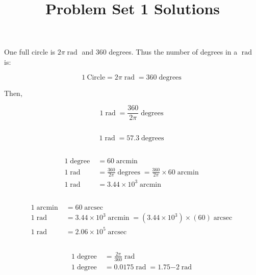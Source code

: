 \documentclass[11pt]{scrartcl}
\title{Problem Set 1 Solutions}
\DeclareMathOperator{\arcsec}{arcsec}
\DeclareMathOperator{\rad}{rad}
\DeclareMathOperator{\degrees}{degrees}
\DeclareMathOperator{\degree}{degree}
\DeclareMathOperator{\arcmin}{arcmin}
\newcommand\pow[2]{\ensuremath{#1 \times 10^{#2}}}
\begin{document}
\maketitle

\section{}

One full circle is $2\pi \rad$ and $360$ degrees. Thus the number of degrees in a $\rad$ is:

\[1\ \text{Circle} = 2\pi \rad = 360\degrees\]

Then,

\[1 \rad = \frac{360}{2\pi}\degrees\]

\subsection{}

\[1 \rad = 57.3\degrees\]

\subsection{}

\begin{align*}
1\degree &= 60\arcmin \\
1 \rad &= \frac{360}{2\pi} \degrees = \frac{360}{2\pi} \times 60 \arcmin \\
1 \rad &= \pow{3.44}{3}\arcmin
\end{align*}

\subsection{}

\begin{align*}
1\arcmin &= 60\arcsec \\
1 \rad &= \pow{3.44}{3}\arcmin = (\pow{3.44}{3})\times(60)\arcsec \\
1 \rad &= \pow{2.06}{5}\arcsec
\end{align*}

\subsection{}

\begin{align*}
1 \degree &= \frac{2\pi}{360}\rad \\
1 \degree &= 0.0175 \rad = {1.75}{-2}\rad
\end{align*}
\end{document}
